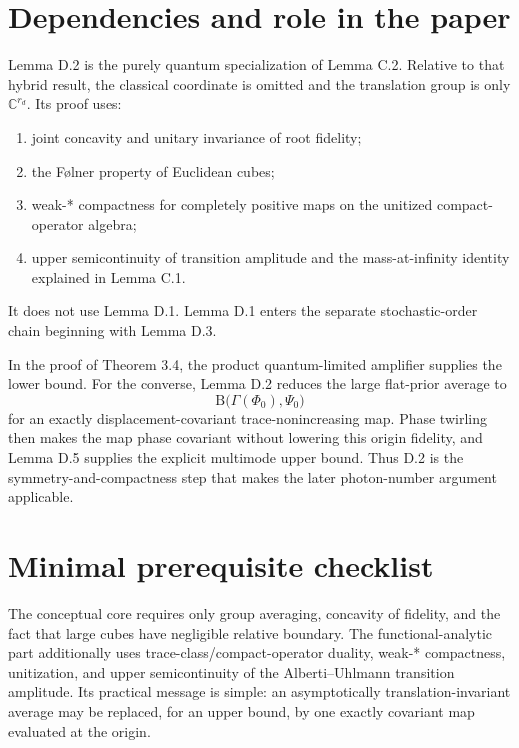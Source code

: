 \documentclass[11pt]{article}
\newcommand{\C}{\mathbb C}
\newcommand{\B}{\mathrm B}
\begin{document}
\section{Dependencies and role in the paper}

Lemma D.2 is the purely quantum specialization of Lemma C.2.  Relative to
that hybrid result, the classical coordinate is omitted and the translation
group is only $\C^{r_d}$.  Its proof uses:
\begin{enumerate}
  \item joint concavity and unitary invariance of root fidelity;
  \item the F\o lner property of Euclidean cubes;
  \item weak-* compactness for completely positive maps on the unitized
  compact-operator algebra;
  \item upper semicontinuity of transition amplitude and the
  mass-at-infinity identity explained in Lemma C.1.
\end{enumerate}
It does not use Lemma D.1.  Lemma D.1 enters the separate stochastic-order
chain beginning with Lemma D.3.

In the proof of Theorem 3.4, the product quantum-limited amplifier supplies
the lower bound.  For the converse, Lemma D.2 reduces the large flat-prior
average to
\[
  \B\bigl(\Gamma(\Phi_0),\Psi_0\bigr)
\]
for an exactly displacement-covariant trace-nonincreasing map.  Phase
twirling then makes the map phase covariant without lowering this origin
fidelity, and Lemma D.5 supplies the explicit multimode upper bound.  Thus
D.2 is the symmetry-and-compactness step that makes the later photon-number
argument applicable.

\section{Minimal prerequisite checklist}

The conceptual core requires only group averaging, concavity of fidelity,
and the fact that large cubes have negligible relative boundary.  The
functional-analytic part additionally uses trace-class/compact-operator
duality, weak-* compactness, unitization, and upper semicontinuity of the
Alberti--Uhlmann transition amplitude.  Its practical message is simple:
an asymptotically translation-invariant average may be replaced, for an
upper bound, by one exactly covariant map evaluated at the origin.
\end{document}
